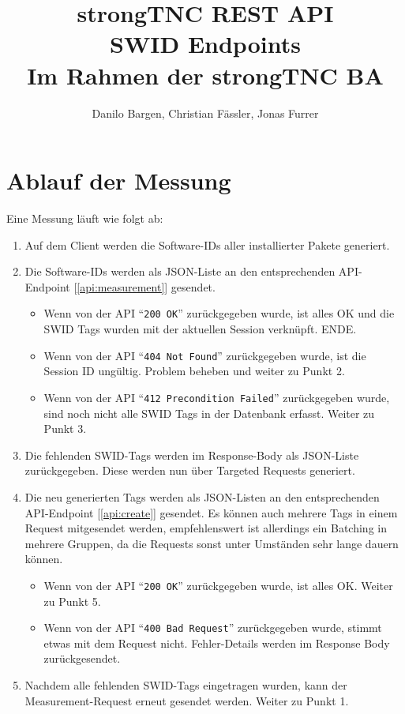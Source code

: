 \documentclass[10pt,a4paper]{scrartcl}
\author{Danilo Bargen, Christian Fässler, Jonas Furrer}
\title{strongTNC REST API\\SWID Endpoints \\ \small{Im Rahmen der strongTNC BA} }
\begin{document}
\begin{titlepage}
	\maketitle
	\vspace{120mm}
	\thispagestyle{empty} %
\end{titlepage}

\newpage
	\tableofcontents
\newpage

\section{Ablauf der Messung}

Eine Messung läuft wie folgt ab:

\begin{enumerate}
	\item Auf dem Client werden die Software-IDs aller installierter Pakete generiert.
	\item Die Software-IDs werden als JSON-Liste an den entsprechenden
		API-Endpoint [\ref{api:measurement}] gesendet.
	\begin{itemize}
		\item Wenn von der API ``\texttt{200 OK}'' zurückgegeben wurde, ist alles OK und die SWID
			Tags wurden mit der aktuellen Session verknüpft. ENDE.
		\item Wenn von der API ``\texttt{404 Not Found}'' zurückgegeben wurde, ist
			die Session ID ungültig. Problem beheben und weiter zu Punkt 2.
		\item Wenn von der API ``\texttt{412 Precondition Failed}'' zurückgegeben wurde, sind
			noch nicht alle SWID Tags in der Datenbank erfasst. Weiter zu Punkt 3.
	\end{itemize}
	\item Die fehlenden SWID-Tags werden im Response-Body als JSON-Liste
		zurückgegeben. Diese werden nun über Targeted Requests generiert.
	\item Die neu generierten Tags werden als JSON-Listen an den entsprechenden
		API-Endpoint [\ref{api:create}] gesendet. Es können auch mehrere Tags in
		einem Request mitgesendet werden, empfehlenswert ist allerdings ein
		Batching in mehrere Gruppen, da die Requests sonst unter Umständen sehr
		lange dauern können.
	\begin{itemize}
		\item Wenn von der API ``\texttt{200 OK}'' zurückgegeben wurde, ist alles
			OK. Weiter zu Punkt 5.
		\item Wenn von der API ``\texttt{400 Bad Request}'' zurückgegeben wurde,
			stimmt etwas mit dem Request nicht. Fehler-Details werden im Response Body
			zurückgesendet.
	\end{itemize}
	\item Nachdem alle fehlenden SWID-Tags eingetragen wurden, kann der
		Measurement-Request erneut gesendet werden. Weiter zu Punkt 1.
\end{enumerate}
\end{document}
